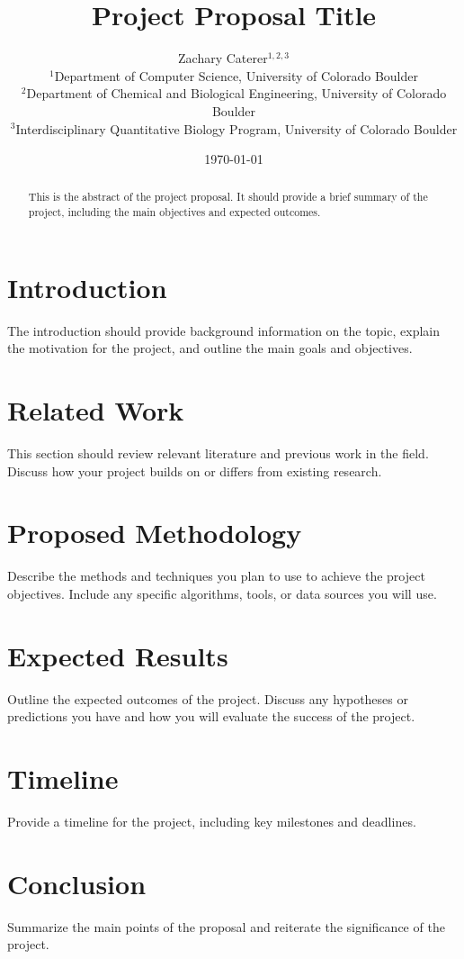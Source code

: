 \documentclass[10pt,twocolumn]{article}
\title{\textbf{Project Proposal Title}}
\author{
    Zachary Caterer$^{1,2,3}$ \\
    \small $^1$Department of Computer Science, University of Colorado Boulder \\
    \small $^2$Department of Chemical and Biological Engineering, University of Colorado Boulder \\
    \small $^3$Interdisciplinary Quantitative Biology Program, University of Colorado Boulder
}
\date{\today}
\begin{document}
\maketitle

\begin{abstract}
This is the abstract of the project proposal. It should provide a brief summary of the project, including the main objectives and expected outcomes.
\end{abstract}

\section{Introduction}
The introduction should provide background information on the topic, explain the motivation for the project, and outline the main goals and objectives.

\section{Related Work}
This section should review relevant literature and previous work in the field. Discuss how your project builds on or differs from existing research.

\section{Proposed Methodology}
Describe the methods and techniques you plan to use to achieve the project objectives. Include any specific algorithms, tools, or data sources you will use.

\section{Expected Results}
Outline the expected outcomes of the project. Discuss any hypotheses or predictions you have and how you will evaluate the success of the project.

\section{Timeline}
Provide a timeline for the project, including key milestones and deadlines.

\section{Conclusion}
Summarize the main points of the proposal and reiterate the significance of the project.



\end{document}
